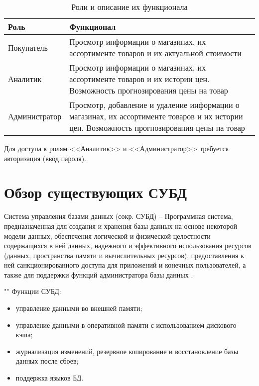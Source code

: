 \documentclass[a4paper,14pt]{extreport}
\begin{document}
\begin{table}[H]
	\caption{Роли и описание их функционала}
	\begin{center}
		\begin{tabular}{| l | p{12 cm} |} 
			\hline
			
			\textbf{Роль} & \textbf{Функционал} \\  
			
			\hline
			
			Покупатель & Просмотр информации о магазинах, их ассортименте товаров и их актуальной стоимости \\
			
			\hline
			
			Аналитик & Просмотр информации о магазинах, их ассортименте товаров и их истории цен. Возможность прогнозирования цены на товар \\
			
			\hline
			
			Администратор & Просмотр, добавление и удаление информации о магазинах, их ассортименте товаров и их истории цен. Возможность прогнозирования цены на товар \\
			
			\hline
		\end{tabular}
	\end{center}
\end{table}

Для доступа к ролям <<Аналитик>> и <<Администратор>> требуется авторизация (ввод пароля).

\section{Обзор существующих СУБД}

Система управления базами данных (сокр. СУБД) -- Программная система, предназначенная для создания и хранения базы данных на основе некоторой модели данных, обеспечения логической и физической целостности содержащихся в ней данных, надежного и эффективного использования ресурсов (данных, пространства памяти и вычислительных ресурсов), предоставления к ней санкционированного доступа для приложений и конечных пользователей, а также для поддержки 
функций администратора базы данных \cite{kogal}.

""\newline
Функции СУБД:

\begin{itemize}
	\setlength\itemsep{0.05em}
	\item управление данными во внешней памяти;
	\item управление данными в оперативной памяти с использованием дискового кэша;
	\item журнализация изменений, резервное копирование и восстановление базы данных после сбоев;
	\item поддержка языков БД.
\end{itemize}
\end{document}
